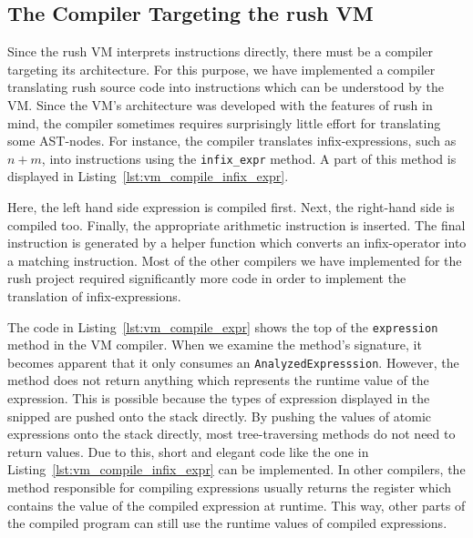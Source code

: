 \subsection{The Compiler Targeting the rush VM}

Since the rush VM interprets instructions directly, there must be a compiler targeting its architecture.
For this purpose, we have implemented a compiler translating rush source code into instructions which can be understood by the VM\@.
Since the VM's architecture was developed with the features of rush in mind,
the compiler sometimes requires surprisingly little effort for translating some AST-nodes.
For instance, the compiler translates infix-expressions, such as $n + m$, into instructions using the \texttt{infix\_expr} method.
A part of this method is displayed in Listing~\ref{lst:vm_compile_infix_expr}.


Here, the left hand side expression is compiled first.
Next, the right-hand side is compiled too.
Finally, the appropriate arithmetic instruction is inserted.
The final instruction is generated by a helper function which converts an infix-operator into a matching instruction.
Most of the other compilers we have implemented for the rush project required significantly more code in order to implement the translation of infix-expressions.


The code in Listing~\ref{lst:vm_compile_expr} shows the top of the \texttt{expression} method in the VM compiler.
When we examine the method's signature, it becomes apparent that it only consumes an \texttt{AnalyzedExpresssion}.
However, the method does not return anything which represents the runtime value of the expression.
This is possible because the types of expression displayed in the snipped are pushed onto the stack directly.
By pushing the values of atomic expressions onto the stack directly, most tree-traversing methods do not need to return values.
Due to this, short and elegant code like the one in Listing~\ref{lst:vm_compile_infix_expr} can be implemented.
In other compilers, the method responsible for compiling expressions usually returns the register which contains the value of the compiled expression at runtime.
This way, other parts of the compiled program can still use the runtime values of compiled expressions.

